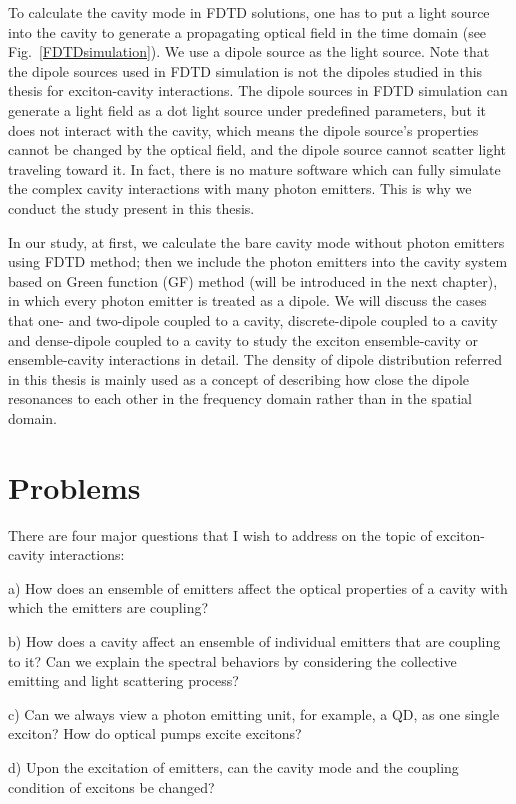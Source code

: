 To calculate the cavity mode in FDTD solutions, one has to put a light source into the cavity to generate a propagating optical field in the time domain (see Fig.~\ref{FDTDsimulation}). We use a dipole source as the light source. Note that the dipole sources used in FDTD simulation is not the dipoles studied in this thesis for exciton-cavity interactions. The dipole sources in FDTD simulation can generate a light field as a dot light source under predefined parameters, but it does not interact with the cavity, which means the dipole source's properties cannot be changed by the optical field, and the dipole source cannot scatter light traveling toward it. In fact, there is no mature software which can fully simulate the complex cavity interactions with many photon emitters. This is why we conduct the study present in this thesis.


In our study, at first, we calculate the bare cavity mode without photon emitters using FDTD method; then we include the photon emitters into the cavity system based on Green function (GF) method (will be introduced in the next chapter), in which every photon emitter is treated as a dipole. We will discuss the cases that one- and two-dipole coupled to a cavity, discrete-dipole coupled to a cavity and dense-dipole coupled to a cavity to study the exciton ensemble-cavity or ensemble-cavity interactions in detail. The density of dipole distribution referred in this thesis is mainly used as a concept of describing how close the dipole resonances to each other in the frequency domain rather than in the spatial domain.

\section{Problems}
There are four major questions that I wish to address on the topic of exciton-cavity interactions:

a) How does an ensemble of emitters affect the optical properties of a cavity with which the emitters are coupling?

b) How does a cavity affect an ensemble of individual emitters that are coupling to it? Can we explain the spectral behaviors by considering the collective emitting and light scattering process?

c) Can we always view a photon emitting unit, for example, a QD, as one single exciton? How do optical pumps excite excitons?

d) Upon the excitation of emitters, can the cavity mode and the coupling condition of excitons be changed?


